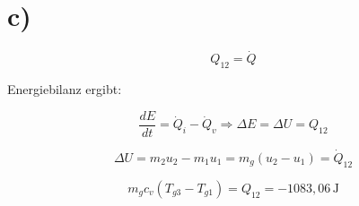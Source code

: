 

\section*{c)}

\[
Q_{12} = \dot{Q}
\]

Energiebilanz ergibt:

\[
\frac{dE}{dt} = \dot{Q}_i - \dot{Q}_v \Rightarrow \Delta E = \Delta U = Q_{12}
\]

\[
\Delta U = m_2 u_2 - m_1 u_1 = m_g (u_2 - u_1) = \dot{Q}_{12}
\]

\[
m_g c_v (T_{g3} - T_{g1}) = Q_{12} = -1083,06 \, \text{J}
\]